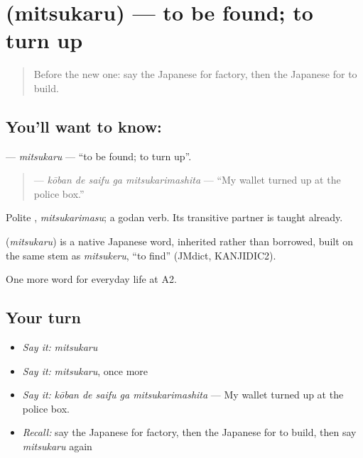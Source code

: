 \section[\texorpdfstring{\ja{みつかる} (mitsukaru)}{みつかる (mitsukaru)}]{ (mitsukaru) — to be found; to turn up}

\label{lesson:JA-C197-mitsukaru}



\begin{quote}
Before the new one: say the Japanese for factory, then the Japanese for to build.
\end{quote}

\subsection*{You'll want to know: }
\textbf{} — \emph{mitsukaru} — \textquotedblleft{}to be found; to turn up\textquotedblright{}.

\begin{quote}
\textbf{  } — \emph{kōban de saifu ga mitsukarimashita} — \textquotedblleft{}My wallet turned up at the police box.\textquotedblright{}
\end{quote}

Polite \textbf{}, \emph{mitsukarimasu}; a godan verb. Its transitive partner \textbf{} is taught already.

\begin{cousinweb}
\textbf{} (\emph{mitsukaru}) is a native Japanese word, inherited rather than borrowed, built on the same stem as \emph{mitsukeru}, \textquotedblleft{}to find\textquotedblright{} (JMdict, KANJIDIC2).
\end{cousinweb}

\begin{grammarlens}[title={What you've built}]
One more word for everyday life at A2.
\end{grammarlens}

\subsection*{Your turn}
\begin{itemize}
\raggedright
  \item \emph{Say it:} \emph{mitsukaru}
  \item \emph{Say it:} \emph{mitsukaru}, once more
  \item \emph{Say it:} \emph{kōban de saifu ga mitsukarimashita} — My wallet turned up at the police box.
  \item \emph{Recall:} say the Japanese for factory, then the Japanese for to build, then say \emph{mitsukaru} again
\end{itemize}

